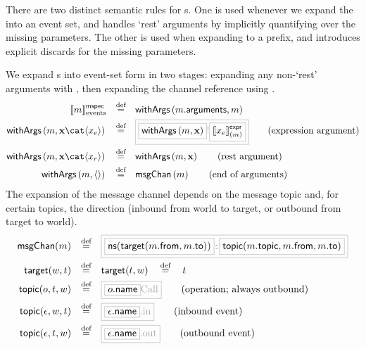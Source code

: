 There are two distinct semantic rules for \mmessagespec s.  One is used whenever
we expand the \mmessagespec{} into an event set, and handles `rest' arguments
by implicitly quantifying over the missing parameters.  The other is used when
expanding to a prefix, and introduces explicit discards for the missing
parameters.  

\begin{definition}

We expand \mmessagespec s into event-set form in two stages: expanding
any non-`rest' arguments with , then expanding the channel
reference using .
%
\begin{align*}
	\emspecsema{\amspec}
\quad\defeq\quad&
\funcname{withArgs}\left(\field{\amspec}{arguments}, \amspec\right)
\\
	\funcname{withArgs}\left(\amspec, \anarglist\cat\langle\anexprarg\rangle\right)
\quad\defeq\quad&
\tlang{
	\olang{\funcname{withArgs}\left(\amspec, \anarglist\right)}
	!\olang{\exprsema{\anexprarg}{\amspec}}
}
\tag{expression argument}
\\
	\funcname{withArgs}\left(\amspec, \anarglist\cat\langle\arestarg\rangle\right)
\quad\defeq\quad&
	\funcname{withArgs}\left(\amspec, \anarglist\right)
\tag{rest argument}
\\
	\funcname{withArgs}\left(\amspec, \langle\rangle\right)
\quad\defeq\quad&
	\funcname{msgChan}\left(\amspec\right)
\tag{end of arguments}
\end{align*}
The expansion of the message channel
depends on the message topic
and, for certain topics, the direction (inbound from world to target, or
outbound from target to world).
\newcommand{\nsOf}[1]{\mathsf{ns}(#1)}
\newcommand{\targetOf}[2]{\mathsf{target}(#1,#2)}
\newcommand{\topicOf}[3]{\mathsf{topic}(#1,#2,#3)}
%
\begin{align*}
	\funcname{msgChan}(\amspec)
\quad\defeq\quad&
\tlang{
	\olang{\nsOf{\targetOf{\field{\amspec}{from}}{\field{\amspec}{to}}}}
	{}\cspnsop{}
	\olang{\topicOf{\field{\amspec}{topic}}{\field{\amspec}{from}}{\field{\amspec}{to}}}
}
\\
	\targetOf{\aworld}{\atarget}
\quad\defeq\quad&
	\targetOf{\atarget}{\aworld}
	\quad\defeq\quad
	\atarget
\\
	\topicOf{\anop}{\atarget}{\aworld}
\quad\defeq\quad&
\tlang{
	\olang{\field{\anop}{name}}\text{Call}
}
\tag{operation; always outbound}
\\
	\topicOf{\anevent}{\aworld}{\atarget}
\quad\defeq\quad&
	\tlang{\olang{\field{\anevent}{name}}\text{.in}}
\tag{inbound event}
\\
	\topicOf{\anevent}{\atarget}{\aworld}
\quad\defeq\quad&
	\tlang{\olang{\field{\anevent}{name}}\text{.out}}
\tag{outbound event}
\end{align*}
\end{definition}

